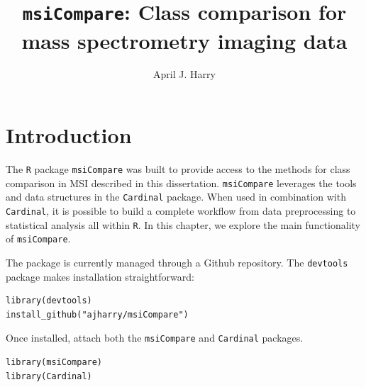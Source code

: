 \documentclass[a4paper]{article}\usepackage[]{graphicx}\usepackage[]{color}
\title{\texttt{msiCompare}: Class comparison for mass spectrometry imaging data}
\author{April J. Harry}
\makeatletter
\newenvironment{kframe}{%
 \def\at@end@of@kframe{}%
 \ifinner\ifhmode%
  \def\at@end@of@kframe{\end{minipage}}%
  \begin{minipage}{\columnwidth}%
 \fi\fi%
 \def\FrameCommand##1{\hskip\@totalleftmargin \hskip-\fboxsep
 \colorbox{shadecolor}{##1}\hskip-\fboxsep
     \hskip-\linewidth \hskip-\@totalleftmargin \hskip\columnwidth}%
 \MakeFramed {\advance\hsize-\width
   \@totalleftmargin\z@ \linewidth\hsize
   \@setminipage}}%
 {\par\unskip\endMakeFramed%
 \at@end@of@kframe}
\newenvironment{knitrout}{}{} %
\makeatother
\begin{document}
\maketitle

\tableofcontents



\section{Introduction}
The \texttt{R} package \texttt{msiCompare} was built to provide access to the methods for class comparison in MSI described in this dissertation. \texttt{msiCompare} leverages the tools and data structures in the \texttt{Cardinal} package. When used in combination with \texttt{Cardinal}, it is possible to build a complete workflow from data preprocessing to statistical analysis all within \texttt{R}. In this chapter, we explore the main functionality of \texttt{msiCompare}.

The package is currently managed through a Github repository. The \texttt{devtools} package makes installation straightforward:

\begin{knitrout}
\color{fgcolor}\begin{kframe}
\begin{verbatim}
library(devtools)
install_github("ajharry/msiCompare")
\end{verbatim}
\end{kframe}
\end{knitrout}

Once installed, attach both the \texttt{msiCompare} and \texttt{Cardinal} packages.
\begin{knitrout}
\color{fgcolor}\begin{kframe}
\begin{verbatim}
library(msiCompare)
library(Cardinal)
\end{verbatim}
\end{kframe}
\end{knitrout}
\end{document}

